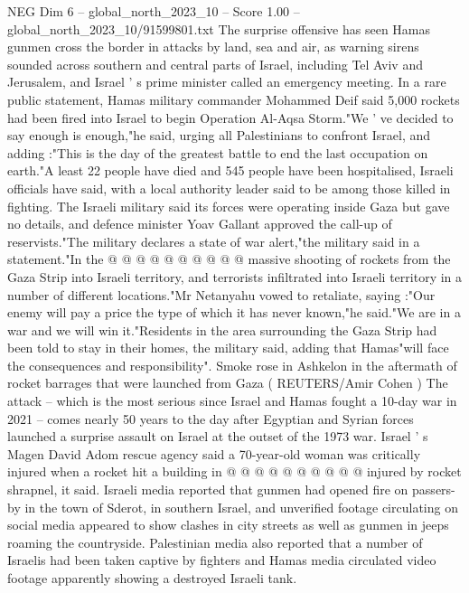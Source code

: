 \begin{textsample}{NEG Dim 6 – global\_north\_2023\_10 – Score 1.00 – global\_north\_2023\_10/91599801.txt}  \label{ex:f6_neg_202}
The surprise offensive has seen Hamas gunmen cross the border in attacks by land, sea and air, as warning sirens sounded across southern and central parts of Israel, including Tel Aviv and Jerusalem, and Israel ' s prime minister called an emergency meeting.
In a rare public statement, Hamas military commander Mohammed Deif said 5,000 rockets had been fired into Israel to begin Operation Al-Aqsa Storm."We ' ve decided to say enough is enough,"he said, urging all Palestinians to confront Israel, and adding :"This is the day of the greatest battle to end the last occupation on earth."A least 22 people have died and 545 people have been hospitalised, Israeli officials have said, with a local authority leader said to be among those killed in fighting.
The Israeli military said its forces were operating inside Gaza but gave no details, and defence minister Yoav Gallant approved the call-up of reservists."The military declares a state of war alert,"the military said in a statement."In the @ @ @ @ @ @ @ @ @ @ massive shooting of rockets from the Gaza Strip into Israeli territory, and terrorists infiltrated into Israeli territory in a number of different locations."Mr Netanyahu vowed to retaliate, saying :"Our enemy will pay a price the type of which it has never known,"he said."We are in a war and we will win it."Residents in the area surrounding the Gaza Strip had been told to stay in their homes, the military said, adding that Hamas"will face the consequences and responsibility".
Smoke rose in Ashkelon in the aftermath of rocket barrages that were launched from Gaza ( REUTERS/Amir Cohen ) The attack -- which is the most serious since Israel and Hamas fought a 10-day war in 2021 -- comes nearly 50 years to the day after Egyptian and Syrian forces launched a surprise assault on Israel at the outset of the 1973 war.
Israel ' s Magen David Adom rescue agency said a 70-year-old woman was critically injured when a rocket hit a building in @ @ @ @ @ @ @ @ @ @ injured by rocket shrapnel, it said.
Israeli media reported that gunmen had opened fire on passers-by in the town of Sderot, in southern Israel, and unverified footage circulating on social media appeared to show clashes in city streets as well as gunmen in jeeps roaming the countryside.
Palestinian media also reported that a number of Israelis had been taken captive by fighters and Hamas media circulated video footage apparently showing a destroyed Israeli tank.

\end{textsample}
